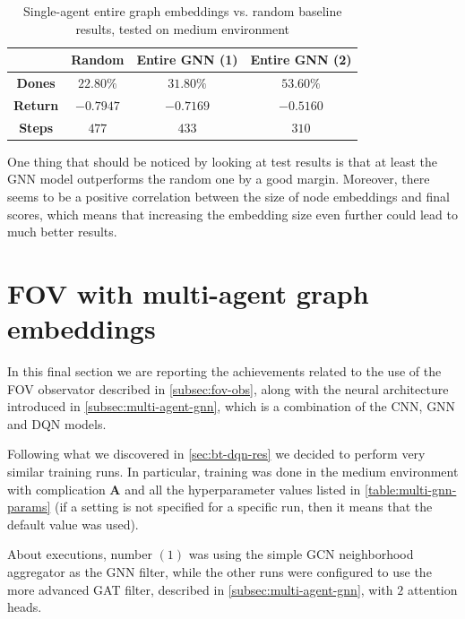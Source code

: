 \documentclass[a4paper,10pt]{report}
\begin{document}
\begin{table}[h]
	\center
	\begin{tabular}{|c|c|c|c|}
		\hline & \textbf{Random} & \textbf{Entire GNN (1)} & \textbf{Entire GNN (2)} \\ \hline
		\textbf{Dones} & $22.80\%$ & $31.80\%$ & $53.60\%$ \\ \hline
		\textbf{Return}& $-0.7947$ & $-0.7169$   & $-0.5160$ \\ \hline
		\textbf{Steps}& $477$ & $433$  & $310$ \\ \hline
	\end{tabular}
	\caption{Single-agent entire graph embeddings vs. random baseline results, tested on medium environment}
	\label{table:entire-gnn-res}
\end{table}

One thing that should be noticed by looking at test results is that at least the GNN model outperforms the random one by a good margin. Moreover, there seems to be a positive correlation between the size of node embeddings and final scores, which means that increasing the embedding size even further could lead to much better results.


\section*{FOV with multi-agent graph embeddings}\label{sec:fov-dqn-gnn-robot-res}

In this final section we are reporting the achievements related to the use of the FOV observator described in \ref{subsec:fov-obs}, along with the neural architecture introduced in \ref{subsec:multi-agent-gnn}, which is a combination of the CNN, GNN and DQN models.

Following what we discovered in \ref{sec:bt-dqn-res} we decided to perform very similar training runs. In particular, training was done in the medium environment with complication \textbf{A} and all the hyperparameter values listed in \ref{table:multi-gnn-params} (if a setting is not specified for a specific run, then it means that the default value was used). 

About executions, number $(1)$ was using the simple GCN neighborhood aggregator as the GNN filter, while the other runs were configured to use the more advanced GAT filter, described in \ref{subsec:multi-agent-gnn}, with $2$ attention heads.
\end{document}
